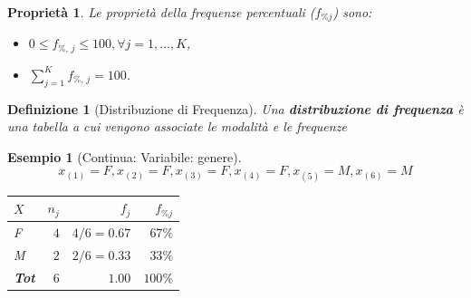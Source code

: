 \documentclass[
  11pt,
]{book}
\providecommand{\tightlist}{%
  \setlength{\itemsep}{0pt}\setlength{\parskip}{0pt}}
\theoremstyle{mytheoremstyle}
\newtheorem{proposition}{Proprietà}[section]
\theoremstyle{mydefstyle}
\newtheorem{definition}{Definizione}[section]
\newtheorem{example}{{Esempio}}[section]
\begin{document}
\begin{info}

\begin{proposition}

Le proprietà della frequenze percentuali (\(f_{\% j}\)) sono:

\begin{itemize}
\tightlist
\item
  \(0\leq f_{\%,\, j} \leq 100, \forall j=1,...,K\),
\item
  \(\sum_{j=1}^{K} f_{\%,\, j} = 100\).
\end{itemize}

\end{proposition}

\end{info}

\begin{info}

\begin{definition}[Distribuzione di Frequenza]
Una \textbf{distribuzione di frequenza} è una tabella a cui vengono associate le modalità e le frequenze
\end{definition}

\end{info}

\begin{example}[Continua: Variabile: genere]

\[x_{(1)}=F,x_{(2)}=F,x_{(3)}=F,x_{(4)}=F,x_{(5)}=M,x_{(6)}=M\]

\begin{table}[!h]
\centering
\begin{tabular}{lrrr}
\toprule
$X$ & $n_j$ & $f_j$ & $f_{\% j}$\\
\midrule
F & $4$ & $4/6=0.67$ & $67\%$\\
M & $2$ & $2/6=0.33$ & $33\%$\\
\midrule
\textbf{Tot} & \textbf{$6$} & \textbf{$1.00$} & \textbf{$100\%$}\\
\midrule
\bottomrule
\end{tabular}
\end{table}

\end{example}
\end{document}
